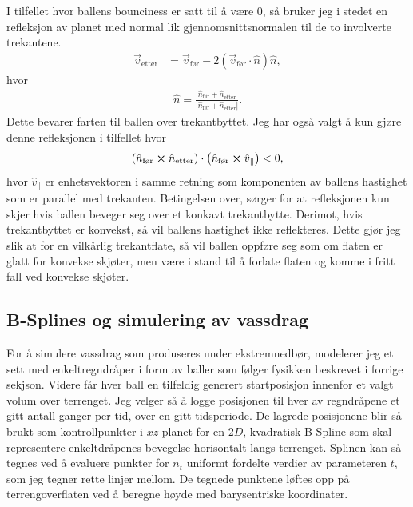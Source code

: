 \documentclass[norsk, doc, 12pt, a4paper]{apa7}  %
\begin{document}
I tilfellet hvor ballens bounciness er satt til å være \(0\), så bruker jeg i stedet en refleksjon av planet med normal lik gjennomsnittsnormalen til de to involverte trekantene.
\begin{align*}
	\vec{v}_{\text{etter}} &= \vec{v}_{\text{før}} - 2\left(\vec{v}_{\text{før}}\cdot\hat{n}\right)\hat{n},
\end{align*}
hvor
\begin{align*}
	\hat{n} = \frac{\hat{n}_{\text{før}}+\hat{n}_{\text{etter}}}{|\hat{n}_{\text{før}}+\hat{n}_{\text{etter}}|}.
\end{align*}
Dette bevarer farten til ballen over trekantbyttet. Jeg har også valgt å kun gjøre denne refleksjonen i tilfellet hvor
\begin{align*}
	\left(\hat{n}_{\text{før}}\cross \hat{n}_{\text{etter}}\right)\cdot\left(\hat{n}_{\text{før}}\cross \hat{v}_{\parallel}\right) < 0,
\end{align*}
hvor \(\hat{v}_{\parallel}\) er enhetsvektoren i samme retning som komponenten av ballens hastighet som er parallel med trekanten.
Betingelsen over, sørger for at refleksjonen kun skjer hvis ballen beveger seg over et konkavt trekantbytte. Derimot, hvis trekantbyttet er konvekst, så vil ballens hastighet ikke reflekteres. Dette gjør jeg slik at for en vilkårlig trekantflate, så vil ballen oppføre seg som om flaten er glatt for konvekse skjøter, men være i stand til å forlate flaten og komme i fritt fall ved konvekse skjøter.

\subsection{B-Splines og simulering av vassdrag}
For å simulere vassdrag som produseres under ekstremnedbør, modelerer jeg et sett med enkeltregndråper i form av baller som følger fysikken beskrevet i forrige sekjson. Videre får hver ball en tilfeldig generert startposisjon innenfor et valgt volum over terrenget. Jeg velger så å logge posisjonen til hver av regndråpene et gitt antall ganger per tid, over en gitt tidsperiode. De lagrede posisjonene blir så brukt som kontrollpunkter i \(xz\)-planet for en \(2D\), kvadratisk B-Spline som skal representere enkeltdråpenes bevegelse horisontalt langs terrenget. Splinen kan så tegnes ved å evaluere punkter for \(n_{t}\) uniformt fordelte verdier av parameteren \(t\), som jeg tegner rette linjer mellom. De tegnede punktene løftes opp på terrengoverflaten ved å beregne høyde med barysentriske koordinater.
\end{document}

